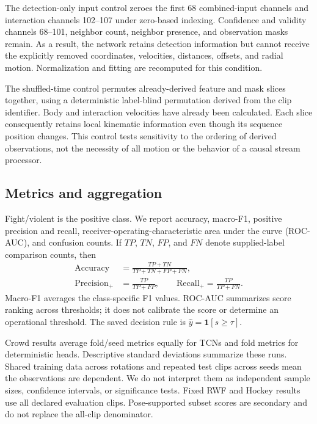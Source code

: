 \documentclass[journal]{IEEEtai}
\begin{document}
The detection-only input control zeroes the first 68 combined-input channels and interaction channels 102--107 under zero-based indexing. Confidence and validity channels 68--101, neighbor count, neighbor presence, and observation masks remain. As a result, the network retains detection information but cannot receive the explicitly removed coordinates, velocities, distances, offsets, and radial motion. Normalization and fitting are recomputed for this condition.

The shuffled-time control permutes already-derived feature and mask slices together, using a deterministic label-blind permutation derived from the clip identifier. Body and interaction velocities have already been calculated. Each slice consequently retains local kinematic information even though its sequence position changes. This control tests sensitivity to the ordering of derived observations, not the necessity of all motion or the behavior of a causal stream processor.

\subsection{Metrics and aggregation}
Fight/violent is the positive class. We report accuracy, macro-F1, positive precision and recall, receiver-operating-characteristic area under the curve (ROC-AUC), and confusion counts. If $TP$, $TN$, $FP$, and $FN$ denote supplied-label comparison counts, then
\begin{align}
\mathrm{Accuracy}&=\frac{TP+TN}{TP+TN+FP+FN},\\
\mathrm{Precision}_{+}&=\frac{TP}{TP+FP},\qquad
\mathrm{Recall}_{+}=\frac{TP}{TP+FN}.
\end{align}
Macro-F1 averages the class-specific F1 values. ROC-AUC summarizes score ranking across thresholds; it does not calibrate the score or determine an operational threshold. The saved decision rule is $\widehat{y}=\mathbf{1}[s\geq\tau]$.

Crowd results average fold/seed metrics equally for TCNs and fold metrics for deterministic heads. Descriptive standard deviations summarize these runs. Shared training data across rotations and repeated test clips across seeds mean the observations are dependent. We do not interpret them as independent sample sizes, confidence intervals, or significance tests. Fixed RWF and Hockey results use all declared evaluation clips. Pose-supported subset scores are secondary and do not replace the all-clip denominator.
\end{document}
